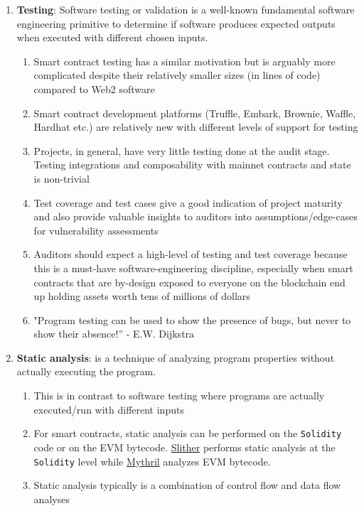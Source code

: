 \begin{enumerate}
\item\textbf{Testing}: Software testing or validation is a well-known fundamental software engineering primitive to determine if software produces expected outputs when executed with different chosen inputs.
	\begin{enumerate}
	\item Smart contract testing has a similar motivation but is arguably more complicated despite their relatively smaller sizes (in lines of code) compared to Web2 software
	\item Smart contract development platforms (Truffle, Embark, Brownie, Waffle, Hardhat etc.) are relatively new with different levels of support for testing
	\item Projects, in general, have very little testing done at the audit stage. Testing integrations and composability with mainnet contracts and state is non-trivial
	\item Test coverage and test cases give a good indication of project maturity and also provide valuable insights to auditors into assumptions/edge-cases for vulnerability assessments
	\item Auditors should expect a high-level of testing and test coverage because this is a must-have software-engineering discipline, especially when smart contracts that are by-design exposed to everyone on the blockchain end up holding assets worth tens of millions of dollars
	\item "Program testing can be used to show the presence of bugs, but never to show their absence!” - E.W. Dijkstra
	\end{enumerate}

\item\textbf{Static analysis}: is a technique of analyzing program properties without actually executing the program.
	\begin{enumerate}
	\item This is in contrast to software testing where programs are actually executed/run with different inputs
	\item For smart contracts, static analysis can be performed on the \verb|Solidity| code or on the EVM bytecode. \href{https://github.com/crytic/slither}{Slither} performs static analysis at the \verb|Solidity| level while \href{https://github.com/ConsenSys/mythril}{Mythril} analyzes EVM bytecode.
	\item Static analysis typically is a combination of control flow and data flow analyses
	\end{enumerate}


\end{enumerate}
